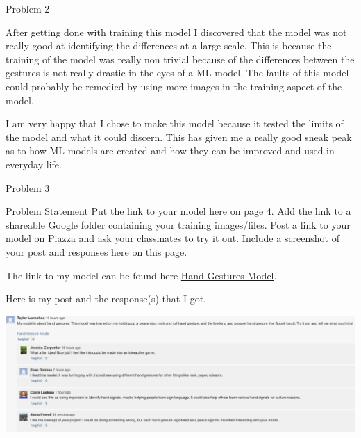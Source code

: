 \begin{problem}{Problem 2}
\begin{Highlight}[Solution]
\begin{spacing}{1.50}
            After getting done with training this model I discovered that the model was not really good at identifying the differences at a large scale. This is because the training of the model was really
            non trivial because of the differences between the gestures is not really drastic in the eyes of a ML model. The faults of this model could probably be remedied by using more images in the training
            aspect of the model. 

            I am very happy that I chose to make this model because it tested the limits of the model and what it could discern. This has given me a really good sneak peak as to how ML models are created
            and how they can be improved and used in everyday life.
        \end{spacing}
        \vspace*{-0.5em}
    \end{Highlight}
\end{problem}

\begin{problem}{Problem 3}
    \begin{statement}{Problem Statement}
        Put the link to your model here on page 4. Add the link to a shareable Google folder containing your training images/files. Post a link to your model on Piazza and ask your classmates to try 
        it out. Include a screenshot of your post and responses here on this page.
    \end{statement}

    \begin{Highlight}[Solution]
        The link to my model can be found here \href{https://teachablemachine.withgoogle.com/models/dkkzS5pWK/}{Hand Gestures Model}. \vspace*{1em}

        Here is my post and the response(s) that I got.

        \begin{center}
            \includegraphics[width = 1.0\textwidth]{./Images/Piazza/Responses.png}
        \end{center}
    \end{Highlight}
\end{problem}

